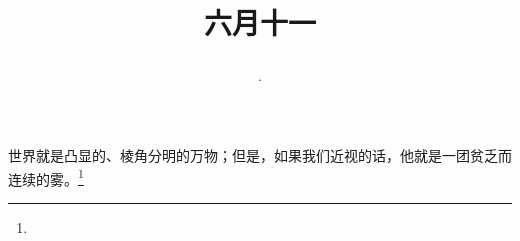 \title{\date[d=16,m=7,y=2024][year:cn-y,年,month:cn,day:cn,日,·,weekday]·六月十一 }
世界就是凸显的、棱角分明的万物；但是，如果我们近视的话，他就是一团贫乏而连续的雾。\footnote{ }

